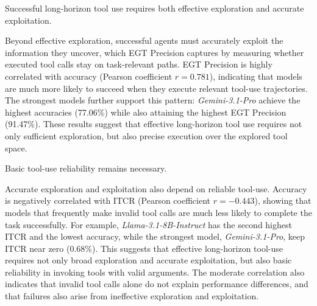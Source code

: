 


\begin{takeaway}
Successful long-horizon tool use requires both effective exploration and accurate exploitation.
\end{takeaway}

\noindent Beyond effective exploration, successful agents must accurately exploit the information they uncover, which EGT Precision captures by measuring whether executed tool calls stay on task-relevant paths. 
EGT Precision is highly correlated with accuracy (Pearson coefficient $r=0.781$), indicating that models are much more likely to succeed when they execute relevant tool-use trajectories.
The strongest models further support this pattern: \textit{Gemini-3.1-Pro} achieve the highest accuracies (77.06\%) while also attaining the highest EGT Precision (91.47\%). 
These results suggest that effective long-horizon tool use requires not only sufficient exploration, but also precise execution over the explored tool space.

\begin{takeaway}
Basic tool-use reliability remains necessary.
\end{takeaway}

\noindent Accurate exploration and exploitation also depend on reliable tool-use. 
Accuracy is negatively correlated with ITCR (Pearson coefficient $r=-0.443$), showing that models that frequently make invalid tool calls are much less likely to complete the task successfully. 
For example, \textit{Llama-3.1-8B-Instruct} has the second highest ITCR and the lowest accuracy, while the strongest model, \textit{Gemini-3.1-Pro}, keep ITCR near zero (0.68\%). 
This suggests that effective long-horizon tool-use requires not only broad exploration and accurate exploitation, but also basic reliability in invoking tools with valid arguments.
The moderate correlation also indicates that invalid tool calls alone do not explain performance differences, and that failures also arise from ineffective exploration and exploitation.
